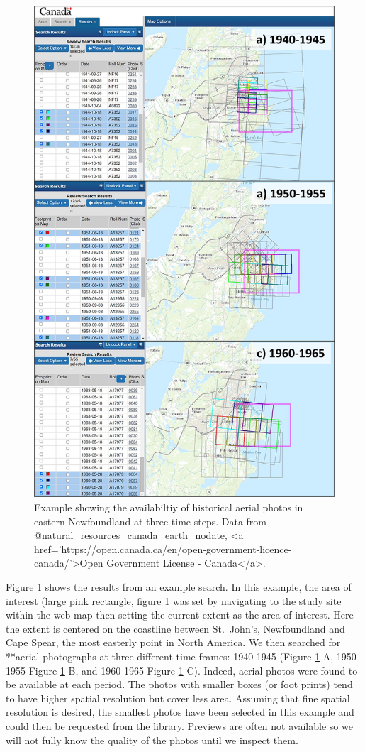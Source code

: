 \documentclass[
]{book}
\begin{document}
\begin{figure}
\includegraphics[width=0.75\linewidth]{images/04-accessing-aerial-photos} \caption{Example showing the availabiltiy of historical aerial photos in eastern Newfoundland at three time steps. Data from @natural_resources_canada_earth_nodate, <a href='https://open.canada.ca/en/open-government-licence-canada/'>Open Government License - Canada</a>.}\label{fig:4-accessing-aerial-photos}
\end{figure}



Figure \ref{fig:4-accessing-aerial-photos} shows the results from an example search. In this example, the area of interest (large pink rectangle, figure \ref{fig:4-accessing-aerial-photos} was set by navigating to the study site within the web map then setting the current extent as the area of interest. Here the extent is centered on the coastline between St.~John's, Newfoundland and Cape Spear, the most easterly point in North America. We then searched for **aerial photographs at three different time frames: 1940-1945 (Figure \ref{fig:4-accessing-aerial-photos} A, 1950-1955 Figure \ref{fig:4-accessing-aerial-photos} B, and 1960-1965 Figure \ref{fig:4-accessing-aerial-photos} C). Indeed, aerial photos were found to be available at each period. The photos with smaller boxes (or foot prints) tend to have higher spatial resolution but cover less area. Assuming that fine spatial resolution is desired, the smallest photos have been selected in this example and could then be requested from the library. Previews are often not available so we will not fully know the quality of the photos until we inspect them.
\end{document}
